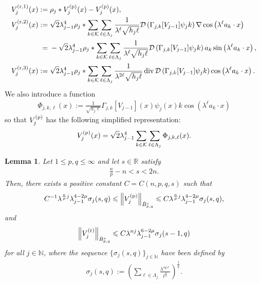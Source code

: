 \documentclass[a4paper,12pt,reqno]{amsart}
\theoremstyle{plain}
\newtheorem{lemm}[thm]{Lemma}
\theoremstyle{definition}
\renewcommand{\div}{\operatorname{div}}
\newcommand{\dB}{\dot{B}}
\renewcommand{\leq}{\leqslant}
\newcommand{\n}[1]{{\left\|#1\right\|}}
\newcommand{\R}{\mathbb{R}}
\newcommand{\N}{\mathbb{N}}
\renewcommand{\sp}[1]{\left(#1\right)}
\newcommand{\p}{{\rm p}}
\begin{document}
\begin{align}
    &
    V^{({\rm r},1)}_{j}(x)
    :={}
    \rho_{j}*V^{(\rm p)}_{j}(x)-V^{(\rm p)}_{j}(x),
    \\
    &
    \begin{aligned}
    V^{({\rm r},2)}_{j}(x)
    :={}&
    \sqrt{2}
    \lambda_{j-1}^4
    \rho_{j}*
    \sum_{k \in \mathcal{K}}
    \sum_{\ell \in \Lambda_j}
    \frac{1}{\lambda^{\ell}\sqrt{h_j\ell}}
    \mathcal{D}
    \sp{\Gamma_{j,k}[V_{j-1}]
    \psi_j
    k}
    \nabla
    \cos\sp{\lambda^\ell a_k \cdot x}
    \\
    ={}&
    -
    \sqrt{2}
    \lambda_{j-1}^4
    \rho_{j}*
    \sum_{k \in \mathcal{K}}
    \sum_{\ell \in \Lambda_j}
    \frac{1}{\lambda^{\ell}\sqrt{h_j\ell}}
    \mathcal{D}
    \sp{\Gamma_{j,k}[V_{j-1}]
    \psi_j
    k}a_k
    \sin\sp{\lambda^\ell a_k \cdot x},
    \end{aligned}
    \\
    &
    V^{({\rm r},3)}_{j}(x)
    :={}
    \sqrt{2}
    \lambda_{j-1}^4
    \rho_{j}*
    \sum_{k \in \mathcal{K}}
    \sum_{\ell \in \Lambda_j}
    \frac{1}{\lambda^{2\ell}\sqrt{h_j\ell}}\div \mathcal{D}
    \sp{\Gamma_{j,k}[V_{j-1}]
    \psi_j
    k}
    \cos\sp{\lambda^\ell a_k \cdot x}.
\end{align}
We also introduce a function 
\begin{align}
    \Phi_{j,k,\ell}(x)
    :=
    \frac{1}{\sqrt{h_j\ell}}
    \Gamma_{j,k}[V_{j-1}](x)
    \psi_{j}(x)k
    \cos\sp{\lambda^{\ell}a_k \cdot x}
\end{align}
so that $V^{(\p)}_j$ has the following simplified representation: 
\begin{align}
    V^{(\rm p)}_{j}(x)
    =
    \sqrt{2}
    \lambda_{j-1}^4
    \sum_{k \in \mathcal{K}}
    \sum_{\ell \in \Lambda_j}
    \Phi_{j,k,\ell}(x).
\end{align}
\begin{lemm}\label{lemm:V_j-Besov}
    Let $1 \leq p,q \leq \infty$ and let $s \in \R$ satisfy
    \begin{align}
        \frac{n}{p}-n<s<2n.
    \end{align}
    Then, there exists a positive constant $C=C(n,p,q,s)$ such that 
    \begin{align}
        \label{est:V^p}
        C^{-1}
        \lambda^{\frac{n}{p}j}
        \lambda_{j-1}^{4-2\mu}
        \sigma_j(s,q)
        \leq 
        \n{V^{({\rm p})}_{j}}_{\dB_{p,q}^{s}}
        \leq 
        C
        \lambda^{\frac{n}{p}j}
        \lambda_{j-1}^{4-2\mu}
        \sigma_j(s,q),
    \end{align}
    and 
    \begin{align}\label{est:V^r}
        \n{V^{({\rm r})}_{j}}_{\dB_{p,q}^{s}}
        \leq 
        C
        \lambda^{nj}
        \lambda_{j-1}^{6-2\mu}\sigma_j(s-1,q)
    \end{align}
    for all $j \in \N$,
    where the sequence $\{\sigma_j(s,q)\}_{j \in \N}$ have been defined by
    \begin{align}
        \sigma_j(s,q)
        :=
        \sp{
        \displaystyle \sum_{\ell \in \Lambda_j}
        \frac{\lambda^{sq\ell}}{\ell^{\frac{q}{2}}}
        }^{\frac{1}{q}}.
    \end{align}
\end{lemm}
\end{document}

